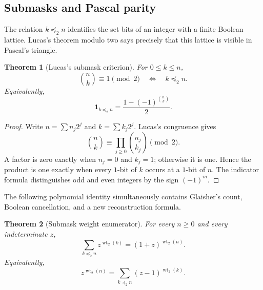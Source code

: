 \documentclass[11pt,oneside]{article}
\newtheorem{theorem}{Theorem}[section]
\theoremstyle{definition}
\theoremstyle{remark}
\newcommand{\wt}{\operatorname{wt}_2}
\newcommand{\ind}{\mathbf 1}
\newcommand{\preceqbits}{\mathrel{\preccurlyeq_2}}
\begin{document}
\subsection{Submasks and Pascal parity}

The relation $k\preceqbits n$ identifies the set bits of an integer with a finite
Boolean lattice.  Lucas's theorem modulo two says precisely that this lattice is
visible in Pascal's triangle.

\begin{theorem}[Lucas's submask criterion]
\label{thm:lucas-submask}
For $0\le k\le n$,
\begin{equation}
  \binom nk\equiv1\pmod2
  \quad\Longleftrightarrow\quad
  k\preceqbits n.                                          \label{eq:lucas-submask}
\end{equation}
Equivalently,
\begin{equation}
  \ind_{k\preceqbits n}
  =\frac{1-(-1)^{\binom nk}}{2}.                            \label{eq:odd-indicator}
\end{equation}
\end{theorem}

\begin{proof}
Write $n=\sum n_j2^j$ and $k=\sum k_j2^j$.  Lucas's congruence gives
\[
  \binom nk\equiv\prod_{j\ge0}\binom{n_j}{k_j}\pmod2.
\]
A factor is zero exactly when $n_j=0$ and $k_j=1$; otherwise it is one.  Hence
the product is one exactly when every $1$-bit of $k$ occurs at a $1$-bit of $n$.
The indicator formula distinguishes odd and even integers by the sign
$(-1)^m$.
\end{proof}

The following polynomial identity simultaneously contains Glaisher's count,
Boolean cancellation, and a new reconstruction formula.

\begin{theorem}[Submask weight enumerator]
\label{thm:submask-enumerator}
For every $n\ge0$ and every indeterminate $z$,
\begin{equation}
  \boxed{\displaystyle
  \sum_{k\preceqbits n}z^{\wt(k)}=(1+z)^{\wt(n)}.}          \label{eq:submask-enumerator}
\end{equation}
Equivalently,
\begin{equation}
  \boxed{\displaystyle
  z^{\wt(n)}=\sum_{k\preceqbits n}(z-1)^{\wt(k)}.}         \label{eq:boolean-binomial-inversion}
\end{equation}
\end{theorem}
\end{document}

